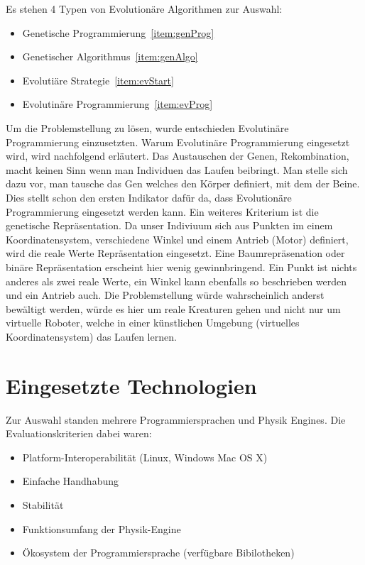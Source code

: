     Es stehen 4 Typen von Evolutionäre Algorithmen zur Auswahl:
    \begin{itemize}
      \item Genetische Programmierung~\ref{item:genProg}
      \item Genetischer Algorithmus~\ref{item:genAlgo}
      \item Evolutiäre Strategie~\ref{item:evStart}
      \item Evolutinäre Programmierung~\ref{item:evProg}
    \end{itemize}
    Um die Problemstellung zu lösen, wurde entschieden Evolutinäre Programmierung einzusetzten.
    Warum Evolutinäre Programmierung eingesetzt wird, wird nachfolgend erläutert.
    Das Austauschen der Genen, Rekombination, macht keinen Sinn wenn man Individuen das Laufen beibringt.
    Man stelle sich dazu vor, man tausche das Gen welches den Körper definiert, mit dem der Beine.
    Dies stellt schon den ersten Indikator dafür da,
    dass Evolutionäre Programmierung eingesetzt werden kann. Ein weiteres Kriterium ist die genetische Repräsentation.
    Da unser Indiviuum sich aus Punkten im einem Koordinatensystem,
    verschiedene Winkel und einem Antrieb (Motor) definiert, wird die reale Werte Repräsentation eingesetzt.
    Eine Baumrepräsenation oder binäre Repräsentation erscheint hier wenig gewinnbringend.
    Ein Punkt ist nichts anderes als zwei reale Werte,
    ein Winkel kann ebenfalls so beschrieben werden und ein Antrieb auch.
    Die Problemstellung würde wahrscheinlich anderst bewältigt werden,
    würde es hier um reale Kreaturen gehen und nicht nur um virtuelle Roboter,
    welche in einer künstlichen Umgebung (virtuelles Koordinatensystem) das Laufen lernen.

  \section{Eingesetzte Technologien}

    Zur Auswahl standen mehrere Programmiersprachen und Physik Engines. Die Evaluationskriterien dabei waren:
    \begin{itemize}
      \item Platform-Interoperabilität (Linux, Windows Mac OS X)
      \item Einfache Handhabung
      \item Stabilität
      \item Funktionsumfang der Physik-Engine
      \item Ökosystem der Programmiersprache (verfügbare Bibilotheken)
    \end{itemize}

